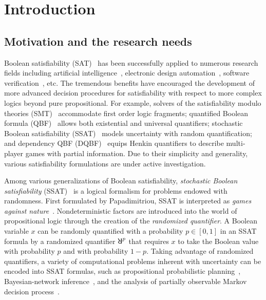 \chapter{Introduction}
\label{chap:introduction}

\section{Motivation and the research needs}
Boolean satisfiability (SAT)~\cite{SATHandbook} has been successfully applied to numerous research fields
including artificial intelligence~\cite{Nilsson2014,Russell2020},
electronic design automation~\cite{Marques2000,Wang2009},
software verification~\cite{Jhala2009, Berard2013}, etc.
The tremendous benefits have encouraged the development of more advanced decision procedures
for satisfiability with respect to more complex logics beyond pure propositional.
For example,
solvers of the satisfiability modulo theories (SMT)~\cite{Moura2011,HBMC-SMT} accommodate first order logic fragments;
quantified Boolean formula (QBF)~\cite{Narizzano2006,SATHandbook-QBF} allows both existential and universal quantifiers;
stochastic Boolean satisfiability (SSAT)~\cite{Littman2001,SATHandbook-SSAT} models uncertainty with random quantification;
and dependency QBF (DQBF)~\cite{Balabanov2014,Scholl2018} equips Henkin quantifiers to describe multi-player games with partial information.
Due to their simplicity and generality,
various satisfiability formulations are under active investigation.

Among various generalizations of Boolean satisfiability,
\textit{stochastic Boolean satisfiability} (SSAT)~\cite{SATHandbook-SSAT} is a logical formalism
for problems endowed with randomness.
First formulated by Papadimitriou,
SSAT is interpreted as \textit{games against nature}~\cite{Papadimitriou1985}.
Nondeterministic factors are introduced into the world of propositional logic
through the creation of the \textit{randomized quantifier}.
A Boolean variable $x$ can be randomly quantified with a probability $p\in[0,1]$ in an SSAT formula
by a randomized quantifier $\random{p}$ that requires $x$ to take the Boolean value
\true with probability $p$ and
\false with probability $1-p$.
Taking advantage of randomized quantifiers,
a variety of computational problems inherent with uncertainty can be encoded into SSAT formulas,
such as propositional probabilistic planning~\cite{Littman1998},
Bayesian-network inference~\cite{Cooper1990,Jensen1996,Bacchus2003},
and the analysis of partially observable Markov decision process~\cite{Majercik2003}.

